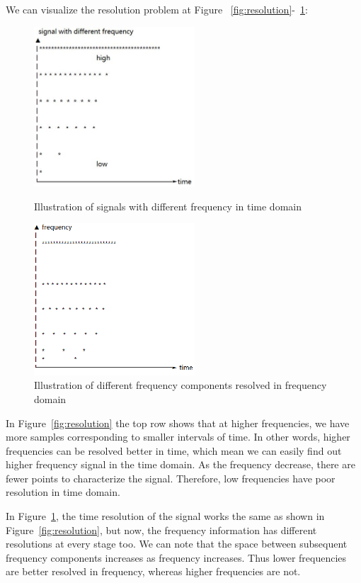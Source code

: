 We can visualize the resolution problem at Figure ~\ref{fig:resolution}-~\ref{fig:resolution_frequency}:

\begin{figure}[htbp]
\centering
\begin{minipage}[t]{0.48\textwidth}
\centering
\includegraphics[width=6cm]{images/resolution_1.JPG}
\caption{Illustration of signals with different frequency in time domain}
\label{fig:resolution}
\end{minipage}
\begin{minipage}[t]{0.48\textwidth}
\centering
\includegraphics[width=6cm]{images/resolution_blank2.PNG}
\caption{Illustration of different frequency components resolved in frequency domain}
\label{fig:resolution_frequency}
\end{minipage}
\end{figure}


In Figure~\ref{fig:resolution} the top row shows that at higher frequencies, we have more samples corresponding to smaller intervals of time. In other words, higher frequencies can be resolved better in time, which mean we can easily find out higher frequency signal in the time domain. As the frequency decrease, there are fewer points to characterize the signal. Therefore, low frequencies have poor resolution in time domain. 

In Figure~\ref{fig:resolution_frequency}, the time resolution of the signal works the same as shown in Figure~\ref{fig:resolution}, but now, the frequency information has different resolutions at every stage too. We can note that the space between subsequent frequency components increases as frequency increases. Thus lower frequencies are better resolved in frequency, whereas higher frequencies are not.

